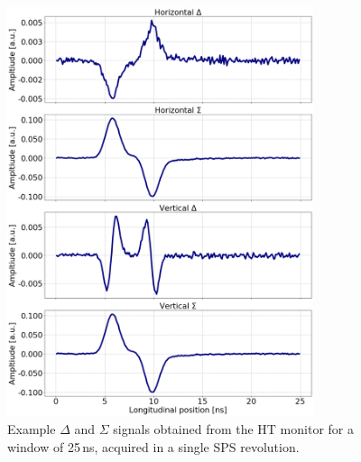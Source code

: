 \begin{figure}[!h]
   \centering         
   \includegraphics[width=0.8\textwidth]{images/Ch4/HT_1D__20180530_114730_exampleAcq_4thesis_turn3000.png}
       \caption{Example $\Delta$ and $\Sigma$ signals obtained from the HT monitor for a window of 25\,ns, acquired in a single SPS revolution.}
       \label{fig:HT_example_acq_singleTurn}
\end{figure}


